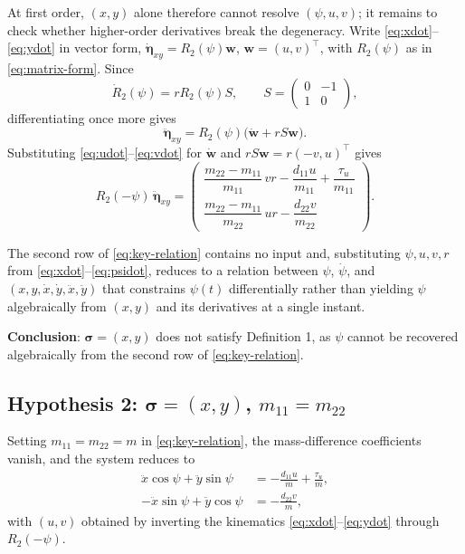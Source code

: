 At first order, $(x,y)$ alone therefore cannot resolve $(\psi,u,v)$; it remains to check whether higher-order derivatives break the degeneracy. Write \eqref{eq:xdot}--\eqref{eq:ydot} in vector form, $\dot{\bm\eta}_{xy}=R_2(\psi)\bm w$, $\bm w=(u,v)^\top$, with $R_2(\psi)$ as in \eqref{eq:matrix-form}. Since
\begin{equation}
\dot R_2(\psi)=rR_2(\psi)S,\qquad S=\begin{pmatrix}0&-1\\1&0\end{pmatrix},
\end{equation}
differentiating once more gives
\begin{equation}
\ddot{\bm\eta}_{xy}=R_2(\psi)\big(\dot{\bm w}+rS\bm w\big).
\label{eq:eta-second}
\end{equation}
Substituting \eqref{eq:udot}--\eqref{eq:vdot} for $\dot{\bm w}$ and $rS\bm w=r(-v,u)^\top$ gives
\begin{equation}
R_2(-\psi)\,\ddot{\bm\eta}_{xy}=
\begin{pmatrix}
\dfrac{m_{22}-m_{11}}{m_{11}}\,vr-\dfrac{d_{11}u}{m_{11}}+\dfrac{\tau_u}{m_{11}}\\[2mm]
\dfrac{m_{22}-m_{11}}{m_{22}}\,ur-\dfrac{d_{22}v}{m_{22}}
\end{pmatrix}.
\label{eq:key-relation}
\end{equation}

The second row of \eqref{eq:key-relation} contains no input and, substituting $\psi,u,v,r$ from \eqref{eq:xdot}--\eqref{eq:psidot}, reduces to a relation between $\psi$, $\dot\psi$, and $(x,y,\dot x,\dot y,\ddot x,\ddot y)$ that constrains $\psi(t)$ differentially rather than yielding $\psi$ algebraically from $(x,y)$ and its derivatives at a single instant.

\textbf{Conclusion}: $\bm\sigma=(x,y)$ does not satisfy Definition 1, as $\psi$ cannot be recovered algebraically from the second row of \eqref{eq:key-relation}.

\subsection{Hypothesis 2: $\bm\sigma=(x,y)$, $m_{11}=m_{22}$}

Setting $m_{11}=m_{22}=m$ in \eqref{eq:key-relation}, the mass-difference coefficients vanish, and the system reduces to
\begin{align}
\ddot x\cos\psi+\ddot y\sin\psi &= -\frac{d_{11}u}{m}+\frac{\tau_u}{m}, \label{eq:row1-h2}\\
-\ddot x\sin\psi+\ddot y\cos\psi &= -\frac{d_{22}v}{m}, \label{eq:row2-h2}
\end{align}
with $(u,v)$ obtained by inverting the kinematics \eqref{eq:xdot}--\eqref{eq:ydot} through $R_2(-\psi)$.

